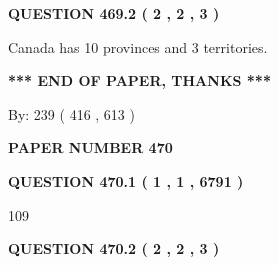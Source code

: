 \documentclass[12pt]{article}
\begin{document}
\vspace{0.2in}
  
{\textbf{\Large{QUESTION
469.2 
 ( 2 , 2 , 3 )
}}}
  
  
 
 
\noindent{}
 
 
Canada has 10  provinces and 3 territories.
 
 
 
 
   
   
 \vspace{0.2in}
 
   
   
   
   
\vspace{1.0in} 
{\textbf{\large{ *** END OF PAPER, THANKS *** }}} 
   
   
\hspace{1.0in} By: 
 239 ( 416 ,  613 )
   
   
   
   
\newpage 
\setcounter{page}{ 
   470001 } 
   
   
   
   
 {\textbf{ \Large{ PAPER NUMBER  470  }}}
   
   
\vspace{0.2in}
   
   
   
   
   
   
 \vspace{0.2in}
 
 
 
 
   
   
  
\vspace{0.2in}
  
{\textbf{\Large{QUESTION
470.1 
 ( 1 , 1 , 6791 )
}}}
  
  
 
 
\noindent{}

109
 
 
  
\vspace{0.2in}
  
{\textbf{\Large{QUESTION
470.2 
 ( 2 , 2 , 3 )
}}}
  
  
 
\end{document}
